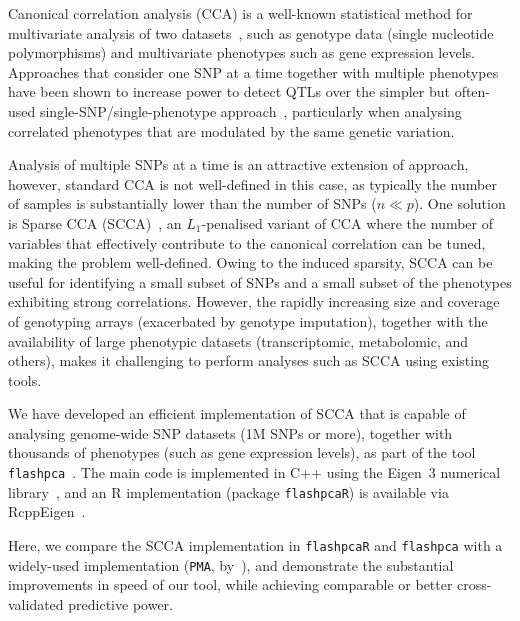 \documentclass{bioinfo}
\begin{document}
Canonical correlation analysis (CCA) is a well-known statistical method for
multivariate analysis of two datasets~\citep{Hotelling1936}, such as genotype
data (single nucleotide polymorphisms) and multivariate phenotypes such as gene
expression levels. Approaches that consider one SNP at a time together with
multiple phenotypes have been shown to increase power to detect QTLs over the
simpler but often-used single-SNP/single-phenotype
approach~\citep{Ferreira2009}, particularly when analysing correlated phenotypes
that are modulated by the same genetic variation.

Analysis of multiple SNPs at a time is an attractive extension of approach,
however, standard CCA is not well-defined in this case, as typically the number
of samples is substantially lower than the number of SNPs ($n{\ll}p$).  One
solution is Sparse CCA (SCCA)~\citep{Witten2009b,Witten2009c,Parkhomenko2009},
an $L_1$-penalised variant of CCA where the number of variables that effectively
contribute to the canonical correlation can be tuned, making the problem
well-defined. Owing to the induced sparsity, SCCA can be useful for identifying
a small subset of SNPs and a small subset of the phenotypes exhibiting strong
correlations.  However, the rapidly increasing size and coverage of genotyping
arrays (exacerbated by genotype imputation), together with the availability of
large phenotypic datasets (transcriptomic, metabolomic, and others), makes it
challenging to perform analyses such as SCCA using existing tools.

We have developed an efficient implementation of SCCA that is capable of
analysing genome-wide SNP datasets (1M SNPs or more), together with thousands of
phenotypes (such as gene expression levels), as part of the tool
\texttt{flashpca}~\citep{Abraham2014}. The main code is implemented in
\textsf{C++} using the Eigen~3 numerical library~\citep{eigenweb}, and an
\textsf{R} implementation (package \texttt{flashpcaR}) is available via
RcppEigen~\citep{Bates2013}.

Here, we compare the SCCA implementation in \texttt{flashpcaR} and
\texttt{flashpca} with a widely-used implementation (\texttt{PMA},
by~\citet{Witten2013}), and demonstrate the substantial improvements in speed of
our tool, while achieving comparable or better cross-validated predictive power.
\end{document}
